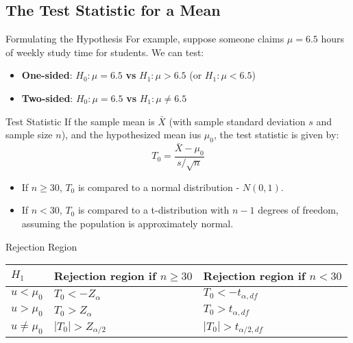 \documentclass[10pt]{extarticle}
\begin{document}
\subsection{The Test Statistic for a Mean}
\begin{conceptbox}{Formulating the Hypothesis}{}
    For example, suppose someone claims $\mu = 6.5$ hours of weekly study time for students. We can test:
    \begin{itemize}
        \item \textbf{One-sided}: $H_0: \mu = 6.5$ \textbf{vs} $H_1: \mu > 6.5$ (or $H_1: \mu < 6.5$)
        \item \textbf{Two-sided}: $H_0: \mu = 6.5$ \textbf{vs} $H_1: \mu \neq 6.5$
    \end{itemize}
\end{conceptbox}



\begin{definitionbox}{Test Statistic}{}
    If the sample mean is $\bar{X}$ (with sample standard deviation $s$ and sample size $n$), and the hypothesized mean ius $\mu_0$, the test statistic is given by:
    $$T_0 = \frac{\bar{X} - \mu_0}{s/\sqrt{n}}$$
    \begin{itemize}
        \item If $n \geq 30$,  $T_0$ is compared to a normal distribution - $N(0, 1)$.
        \item If $n < 30$, $T_0$ is compared to a t-distribution with $n-1$ degrees of freedom, assuming the population is approximately normal.
    \end{itemize}
\end{definitionbox}


\begin{definitionbox}{Rejection Region}{}
        \centering
        \begin{tabularx}{\textwidth}{@{} X X X @{}}
            \toprule
            $H_1$ & Rejection region if $n \geq 30$ & Rejection region if $n < 30$ \\
            \midrule
            $u < \mu _0$ & $T_0 < -Z_{\alpha}$ & $T_0 < -t_{\alpha, df}$ \\
            \addlinespace[2ex]
            $u > \mu _0$ & $T_0 > Z_{\alpha}$ & $T_0 > t_{\alpha, df}$ \\
            \addlinespace[2ex]
            $u \neq \mu _0$ & $|T_0| > Z_{\alpha / 2}$ & $|T_0| > t_{\alpha / 2, df}$ \\
            \bottomrule
        \end{tabularx}
\end{definitionbox}  
\end{document}
